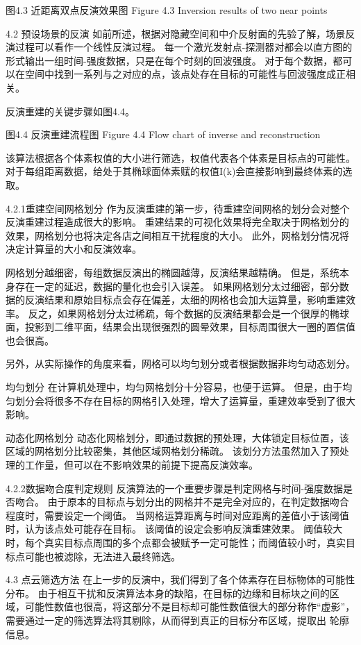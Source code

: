   
图4.3  近距离双点反演效果图
Figure 4.3 Inversion results of two near points

4.2  预设场景的反演
如前所述，根据对隐藏空间和中介反射面的先验了解，场景反演过程可以看作一个线性反演过程。
每一个激光发射点-探测器对都会以直方图的形式输出一组时间-强度数据，只是在每个时刻的回波强度。
对于每个数据，都可以在空间中找到一系列与之对应的点，该点处存在目标的可能性与回波强度成正相关。

反演重建的关键步骤如图4.4。


 
图4.4  反演重建流程图
Figure 4.4 Flow chart of inverse and reconstruction

该算法根据各个体素权值的大小进行筛选，权值代表各个体素是目标点的可能性。
对于每组距离数据，给处于其椭球面体素赋的权值I(k)会直接影响到最终体素的选取。

4.2.1重建空间网格划分
作为反演重建的第一步，待重建空间网格的划分会对整个反演重建过程造成很大的影响。
重建结果的可视化效果将完全取决于网格划分的效果，网格划分也将决定各店之间相互干扰程度的大小。
此外，网格划分情况将决定计算量的大小和反演效率。

网格划分越细密，每组数据反演出的椭圆越薄，反演结果越精确。
但是，系统本身存在一定的延迟，数据的量化也会引入误差。
如果网格划分太过细密，部分数据的反演结果和原始目标点会存在偏差，太细的网格也会加大运算量，影响重建效率。
反之，如果网格划分太过稀疏，每个数据的反演结果都会是一个很厚的椭球面，投影到二维平面，结果会出现很强烈的圆晕效果，目标周围很大一圈的置信值也会很高。

另外，从实际操作的角度来看，网格可以均匀划分或者根据数据非均匀动态划分。

均匀划分
在计算机处理中，均匀网格划分十分容易，也便于运算。
但是，由于均匀划分会将很多不存在目标的网格引入处理，增大了运算量，重建效率受到了很大影响。

动态化网格划分
动态化网格划分，即通过数据的预处理，大体锁定目标位置，该区域的网格划分比较密集，其他区域网格划分稀疏。
该划分方法虽然加入了预处理的工作量，但可以在不影响效果的前提下提高反演效率。

4.2.2数据吻合度判定规则
反演算法的一个重要步骤是判定网格与时间-强度数据是否吻合。
由于原本的目标点与划分出的网格并不是完全对应的，在判定数据吻合程度时，需要设定一个阈值。
当网格运算距离与时间对应距离的差值小于该阈值时，认为该点处可能存在目标。
该阈值的设定会影响反演重建效果。
阈值较大时，每个真实目标点周围的多个点都会被赋予一定可能性；而阈值较小时，真实目标点可能也被滤除，无法进入最终筛选。

4.3  点云筛选方法
在上一步的反演中，我们得到了各个体素存在目标物体的可能性分布。
由于相互干扰和反演算法本身的缺陷，在目标的边缘和目标块之间的区域，可能性数值也很高，将这部分不是目标却可能性数值很大的部分称作“虚影”，需要通过一定的筛选算法将其剔除，从而得到真正的目标分布区域，提取出 轮廓信息。

